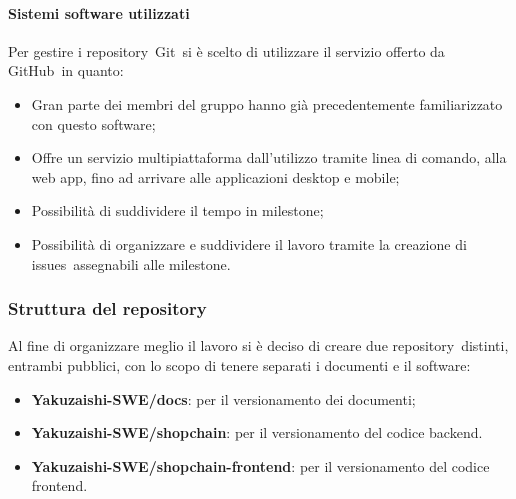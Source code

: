        \paragraph{Sistemi software utilizzati}
        Per gestire i repository\glo\ Git\glo\ si è scelto di utilizzare il servizio offerto da GitHub\glo\ in quanto:
        \begin{itemize}
            \item Gran parte dei membri del gruppo hanno già precedentemente familiarizzato con questo software;
            \item Offre un servizio multipiattaforma dall'utilizzo tramite linea di comando, alla web app, fino ad arrivare alle applicazioni desktop e mobile;
            \item Possibilità di suddividere il tempo in milestone\glo;
            \item Possibilità di organizzare e suddividere il lavoro tramite la creazione di issues\glo\ assegnabili alle milestone\glo.
        \end{itemize} 


    \subsubsection{Struttura del repository}
    Al fine di organizzare meglio il lavoro si è deciso di creare due repository\glo\ distinti, entrambi pubblici, con lo scopo di tenere separati i documenti e il software:
    \begin{itemize}
        \item \textbf{Yakuzaishi-SWE/docs}: per il versionamento dei documenti;
        \item \textbf{Yakuzaishi-SWE/shopchain}: per il versionamento del codice backend\glo.
        \item \textbf{Yakuzaishi-SWE/shopchain-frontend\glo}: per il versionamento del codice frontend\glo.

    \end{itemize}

